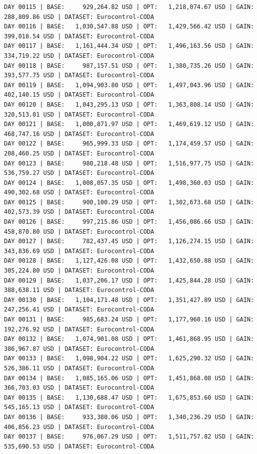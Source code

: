 \documentclass[11pt,a4paper]{article}
\begin{document}
\begin{verbatim}
DAY 00115 | BASE:     929,264.82 USD | OPT:   1,218,074.67 USD | GAIN: 288,809.86 USD | DATASET: Eurocontrol-CODA
DAY 00116 | BASE:   1,030,547.88 USD | OPT:   1,429,566.42 USD | GAIN: 399,018.54 USD | DATASET: Eurocontrol-CODA
DAY 00117 | BASE:   1,161,444.34 USD | OPT:   1,496,163.56 USD | GAIN: 334,719.22 USD | DATASET: Eurocontrol-CODA
DAY 00118 | BASE:     987,157.51 USD | OPT:   1,380,735.26 USD | GAIN: 393,577.75 USD | DATASET: Eurocontrol-CODA
DAY 00119 | BASE:   1,094,903.80 USD | OPT:   1,497,043.96 USD | GAIN: 402,140.15 USD | DATASET: Eurocontrol-CODA
DAY 00120 | BASE:   1,043,295.13 USD | OPT:   1,363,808.14 USD | GAIN: 320,513.01 USD | DATASET: Eurocontrol-CODA
DAY 00121 | BASE:   1,000,871.97 USD | OPT:   1,469,619.12 USD | GAIN: 468,747.16 USD | DATASET: Eurocontrol-CODA
DAY 00122 | BASE:     965,999.33 USD | OPT:   1,174,459.57 USD | GAIN: 208,460.25 USD | DATASET: Eurocontrol-CODA
DAY 00123 | BASE:     980,218.48 USD | OPT:   1,516,977.75 USD | GAIN: 536,759.27 USD | DATASET: Eurocontrol-CODA
DAY 00124 | BASE:   1,008,057.35 USD | OPT:   1,498,360.03 USD | GAIN: 490,302.68 USD | DATASET: Eurocontrol-CODA
DAY 00125 | BASE:     900,100.29 USD | OPT:   1,302,673.68 USD | GAIN: 402,573.39 USD | DATASET: Eurocontrol-CODA
DAY 00126 | BASE:     997,215.86 USD | OPT:   1,456,086.66 USD | GAIN: 458,870.80 USD | DATASET: Eurocontrol-CODA
DAY 00127 | BASE:     782,437.45 USD | OPT:   1,126,274.15 USD | GAIN: 343,836.69 USD | DATASET: Eurocontrol-CODA
DAY 00128 | BASE:   1,127,426.08 USD | OPT:   1,432,650.88 USD | GAIN: 305,224.80 USD | DATASET: Eurocontrol-CODA
DAY 00129 | BASE:   1,037,206.17 USD | OPT:   1,425,844.28 USD | GAIN: 388,638.11 USD | DATASET: Eurocontrol-CODA
DAY 00130 | BASE:   1,104,171.48 USD | OPT:   1,351,427.89 USD | GAIN: 247,256.41 USD | DATASET: Eurocontrol-CODA
DAY 00131 | BASE:     985,683.24 USD | OPT:   1,177,960.16 USD | GAIN: 192,276.92 USD | DATASET: Eurocontrol-CODA
DAY 00132 | BASE:   1,074,901.08 USD | OPT:   1,461,868.95 USD | GAIN: 386,967.87 USD | DATASET: Eurocontrol-CODA
DAY 00133 | BASE:   1,098,904.22 USD | OPT:   1,625,290.32 USD | GAIN: 526,386.11 USD | DATASET: Eurocontrol-CODA
DAY 00134 | BASE:   1,085,165.06 USD | OPT:   1,451,868.08 USD | GAIN: 366,703.03 USD | DATASET: Eurocontrol-CODA
DAY 00135 | BASE:   1,130,688.47 USD | OPT:   1,675,853.60 USD | GAIN: 545,165.13 USD | DATASET: Eurocontrol-CODA
DAY 00136 | BASE:     933,380.06 USD | OPT:   1,340,236.29 USD | GAIN: 406,856.23 USD | DATASET: Eurocontrol-CODA
DAY 00137 | BASE:     976,067.29 USD | OPT:   1,511,757.82 USD | GAIN: 535,690.53 USD | DATASET: Eurocontrol-CODA

\end{verbatim}
\end{document}
